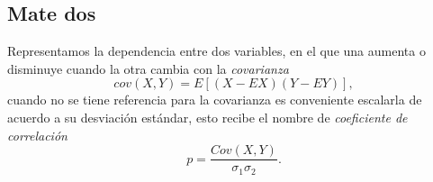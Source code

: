 \subsection{Mate dos}
Representamos la dependencia entre dos variables, en el que una aumenta o disminuye cuando la otra cambia con la \emph{covarianza}
\begin{equation}
cov(X,Y)=E[(X-EX)(Y-EY)],
\end{equation}
cuando no se tiene referencia para la covarianza es conveniente escalarla de acuerdo a su desviación estándar, esto recibe el nombre de  \emph{coeficiente de correlación}
\begin{equation}
p=\frac{Cov(X,Y)}{\sigma_1\sigma_2}.
\end{equation}